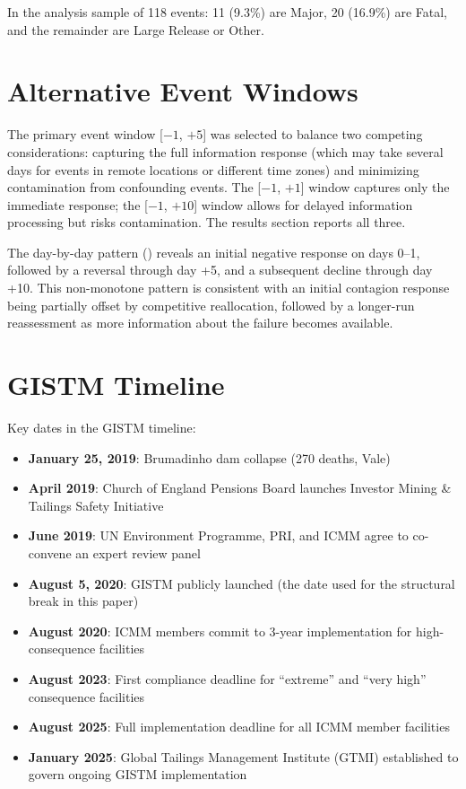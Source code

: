 \documentclass[12pt]{article}
\begin{document}
In the analysis sample of 118 events: 11 (9.3\%) are Major, 20 (16.9\%) are Fatal, and the remainder are Large Release or Other.

\section{Alternative Event Windows}\label{app:windows}

The primary event window [$-1$, $+5$] was selected to balance two competing considerations: capturing the full information response (which may take several days for events in remote locations or different time zones) and minimizing contamination from confounding events. The [$-1$, $+1$] window captures only the immediate response; the [$-1$, $+10$] window allows for delayed information processing but risks contamination. The results section reports all three.

The day-by-day pattern () reveals an initial negative response on days 0--1, followed by a reversal through day +5, and a subsequent decline through day +10. This non-monotone pattern is consistent with an initial contagion response being partially offset by competitive reallocation, followed by a longer-run reassessment as more information about the failure becomes available.

\section{GISTM Timeline}\label{app:gistm}

Key dates in the GISTM timeline:

\begin{itemize}
\item \textbf{January 25, 2019}: Brumadinho dam collapse (270 deaths, Vale)
\item \textbf{April 2019}: Church of England Pensions Board launches Investor Mining \& Tailings Safety Initiative
\item \textbf{June 2019}: UN Environment Programme, PRI, and ICMM agree to co-convene an expert review panel
\item \textbf{August 5, 2020}: GISTM publicly launched (the date used for the structural break in this paper)
\item \textbf{August 2020}: ICMM members commit to 3-year implementation for high-consequence facilities
\item \textbf{August 2023}: First compliance deadline for ``extreme'' and ``very high'' consequence facilities
\item \textbf{August 2025}: Full implementation deadline for all ICMM member facilities
\item \textbf{January 2025}: Global Tailings Management Institute (GTMI) established to govern ongoing GISTM implementation
\end{itemize}
\end{document}
